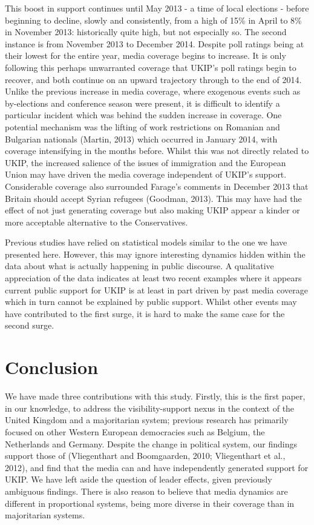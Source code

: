 \documentclass[12pt,article]{article}
\begin{document}
This boost in support continues until May 2013 - a time of local
elections - before beginning to decline, slowly and consistently, from a
high of 15\% in April to 8\% in November 2013: historically quite high,
but not especially so. The second instance is from November 2013 to
December 2014. Despite poll ratings being at their lowest for the entire
year, media coverage begins to increase. It is only following this
perhaps unwarranted coverage that UKIP's poll ratings begin to recover,
and both continue on an upward trajectory through to the end of 2014.
Unlike the previous increase in media coverage, where exogenous events
such as by-elections and conference season were present, it is difficult
to identify a particular incident which was behind the sudden increase
in coverage. One potential mechanism was the lifting of work
restrictions on Romanian and Bulgarian nationals (Martin, 2013) which
occurred in January 2014, with coverage intensifying in the months
before. Whilst this was not directly related to UKIP, the increased
salience of the issues of immigration and the European Union may have
driven the media coverage independent of UKIP's support. Considerable
coverage also surrounded Farage's comments in December 2013 that Britain
should accept Syrian refugees (Goodman, 2013). This may have had the
effect of not just generating coverage but also making UKIP appear a
kinder or more acceptable alternative to the Conservatives.

Previous studies have relied on statistical models similar to the one we
have presented here. However, this may ignore interesting dynamics
hidden within the data about what is actually happening in public
discourse. A qualitative appreciation of the data indicates at least two
recent examples where it appears current public support for UKIP is at
least in part driven by past media coverage which in turn cannot be
explained by public support. Whilst other events may have contributed to
the first surge, it is hard to make the same case for the second surge.

\section{Conclusion}\label{conclusion}

We have made three contributions with this study. Firstly, this is the
first paper, in our knowledge, to address the visibility-support nexus
in the context of the United Kingdom and a majoritarian system; previous
research has primarily focused on other Western European democracies
such as Belgium, the Netherlands and Germany. Despite the change in
political system, our findings support those of (Vliegenthart and
Boomgaarden, 2010; Vliegenthart et al., 2012), and find that the media
can and have independently generated support for UKIP. We have left
aside the question of leader effects, given previously ambiguous
findings. There is also reason to believe that media dynamics are
different in proportional systems, being more diverse in their coverage
than in majoritarian systems.
\end{document}
